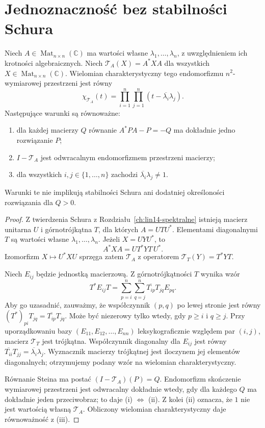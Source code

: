 \section{Jednoznaczność bez stabilności Schura}
\label{sec:lin23-invertibility}

\begin{twierdzenie}
\label{thm:lin23-stein-spectrum}
Niech
\(A\in\operatorname{Mat}_{n\times n}(\mathbb C)\)
ma wartości własne
\(\lambda_1,\ldots,\lambda_n\),
z uwzględnieniem ich krotności
algebraicznych.
Niech
\(\mathcal T_A(X)=A^*XA\)
dla wszystkich
\(X\in\operatorname{Mat}_{n\times n}(\mathbb C)\).
Wielomian charakterystyczny
tego endomorfizmu
\(n^2\)-wymiarowej przestrzeni
jest równy
\[
 \chi_{\mathcal T_A}(t)=
 \prod_{i=1}^n\prod_{j=1}^n
           (t-\overline{\lambda_i}\lambda_j).
\]
Następujące warunki są równoważne:
\begin{enumerate}[label=\textup{(\roman*)}]
 \item dla każdej macierzy \(Q\)
 równanie \(A^*PA-P=-Q\)
 ma dokładnie jedno rozwiązanie \(P\);
 \item \(I-\mathcal T_A\)
 jest odwracalnym endomorfizmem
 przestrzeni macierzy;
 \item dla wszystkich
 \(i,j\in\{1,\ldots,n\}\)
 zachodzi
 \(\overline{\lambda_i}\lambda_j\ne1\).
\end{enumerate}
Warunki te nie implikują
stabilności Schura ani
dodatniej określoności
rozwiązania dla \(Q>0\).
\end{twierdzenie}
\begin{proof}
Z twierdzenia Schura z
Rozdziału~\ref{ch:lin14-spektralne}
istnieją macierz unitarna \(U\)
i górnotrójkątna \(T\),
dla których \(A=UTU^*\).
Elementami diagonalnymi \(T\)
są wartości własne
\(\lambda_1,\ldots,\lambda_n\).
Jeżeli \(X=UYU^*\), to
\[
 A^*XA=UT^*YT\,U^*.
\]
Izomorfizm
\(X\mapsto U^*XU\)
sprzęga zatem \(\mathcal T_A\)
z operatorem
\(\mathcal T_T(Y)=T^*YT\).

Niech \(E_{ij}\)
będzie jednostką macierzową.
Z górnotrójkątności \(T\)
wynika wzór
\[
 T^*E_{ij}T
 =\sum_{p=i}^{n}\sum_{q=j}^{n}
           \overline{T_{ip}}T_{jq}E_{pq}.
\]
Aby go uzasadnić, zauważmy,
że współczynnik \((p,q)\)
po lewej stronie jest równy
\((T^*)_{pi}T_{jq}
 =\overline{T_{ip}}T_{jq}\).
Może być niezerowy tylko
wtedy, gdy \(p\ge i\) i \(q\ge j\).
Przy uporządkowaniu bazy
\((E_{11},E_{12},\ldots,E_{nn})\)
leksykograficznie względem par
\((i,j)\), macierz \(\mathcal T_T\)
jest trójkątna.
Współczynnik diagonalny
dla \(E_{ij}\) jest równy
\(\overline{T_{ii}}T_{jj}
 =\overline{\lambda_i}\lambda_j\).
Wyznacznik macierzy trójkątnej
jest iloczynem jej elementów
diagonalnych; otrzymujemy
podany wzór na wielomian
charakterystyczny.

Równanie Steina ma postać
\((I-\mathcal T_A)(P)=Q\).
Endomorfizm skończenie
wymiarowej przestrzeni jest
odwracalny dokładnie wtedy,
gdy dla każdego \(Q\)
ma dokładnie jeden przeciwobraz;
to daje (i) \(\Leftrightarrow\) (ii).
Z kolei (ii) oznacza,
że \(1\) nie jest wartością
własną \(\mathcal T_A\).
Obliczony wielomian
charakterystyczny daje
równoważność z (iii).
\end{proof}

